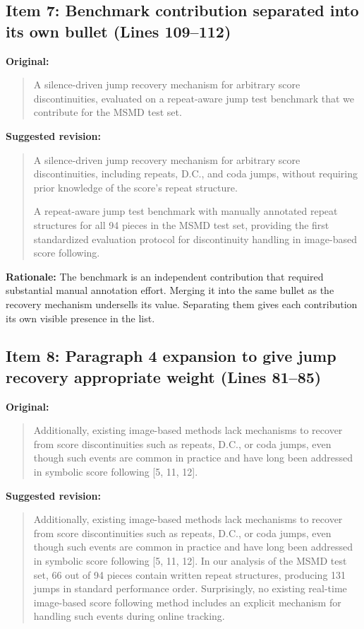 \documentclass{article}
\begin{document}
\subsection*{Item 7: Benchmark contribution separated into its own bullet (Lines 109--112)}

\textbf{Original:}
\begin{quote}
A silence-driven jump recovery mechanism for arbitrary score discontinuities, evaluated on a repeat-aware jump test benchmark that we contribute for the MSMD test set.
\end{quote}

\textbf{Suggested revision:}
\begin{quote}
A silence-driven jump recovery mechanism for arbitrary score discontinuities, including repeats, D.C., and coda jumps, without requiring prior knowledge of the score's repeat structure.

A repeat-aware jump test benchmark with manually annotated repeat structures for all 94 pieces in the MSMD test set, providing the first standardized evaluation protocol for discontinuity handling in image-based score following.
\end{quote}

\textbf{Rationale:}
The benchmark is an independent contribution that required substantial manual annotation effort. Merging it into the same bullet as the recovery mechanism undersells its value. Separating them gives each contribution its own visible presence in the list.

\subsection*{Item 8: Paragraph 4 expansion to give jump recovery appropriate weight (Lines 81--85)}

\textbf{Original:}
\begin{quote}
Additionally, existing image-based methods lack mechanisms to recover from score discontinuities such as repeats, D.C., or coda jumps, even though such events are common in practice and have long been addressed in symbolic score following [5, 11, 12].
\end{quote}

\textbf{Suggested revision:}
\begin{quote}
Additionally, existing image-based methods lack mechanisms to recover from score discontinuities such as repeats, D.C., or coda jumps, even though such events are common in practice and have long been addressed in symbolic score following [5, 11, 12]. In our analysis of the MSMD test set, 66 out of 94 pieces contain written repeat structures, producing 131 jumps in standard performance order. Surprisingly, no existing real-time image-based score following method includes an explicit mechanism for handling such events during online tracking.
\end{quote}
\end{document}
